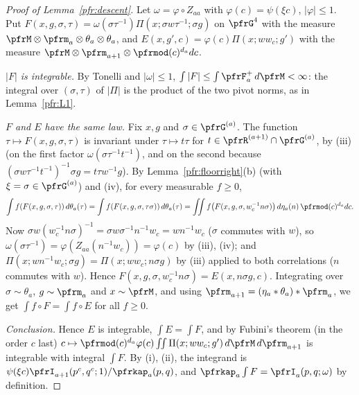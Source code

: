 \documentclass[10pt]{amsart}
\theoremstyle{definition}
\theoremstyle{remark}
\begin{document}
\begin{proof}[Proof of Lemma~\ref{pfr:descent}]
Let $\omega=\varphi\circ Z_{aa}$ with $\varphi(c)=\psi(\xi c)$, $|\varphi|\le1$. Put
$F(x,g,\sigma,\tau)=\omega(\sigma\tau^{-1})\Pi(x;\sigma w\tau^{-1};\sigma g)$ on $\pfrG^4$ with the measure
$\pfrM\otimes\pfrm_a\otimes\theta_a\otimes\theta_a$, and $E(x,g',c)=\varphi(c)\Pi(x;ww_c;g')$ with the measure
$\pfrM\otimes\pfrm_{a+1}\otimes\pfrmod(c)^{d_a}dc$.

\emph{$|F|$ is integrable.} By Tonelli and $|\omega|\le1$, $\int|F|\le\int\pfrF_a^+\,d\pfrM<\infty$: the integral over
$(\sigma,\tau)$ of $|\Pi|$ is the product of the two pivot norms, as in Lemma~\ref{pfr:L1}.

\emph{$F$ and $E$ have the same law.} Fix $x,g$ and $\sigma\in\pfrG^{(a)}$. The function $\tau\mapsto F(x,g,\sigma,\tau)$
is invariant under $\tau\mapsto t\tau$ for $t\in\pfrR^{(a+1)}\cap\pfrG^{(a)}$, by (iii) (on the first factor
$\omega(\sigma\tau^{-1}t^{-1})$, and on the second because $(\sigma w\tau^{-1}t^{-1})^{-1}\sigma g=t\tau w^{-1}g$). By
Lemma~\ref{pfr:floorright}(b) (with $\xi=\sigma\in\pfrG^{(a)}$) and (iv), for every measurable $f\ge0$,
\[
\int f(F(x,g,\sigma,\tau))\,d\theta_a(\tau)=\int f(F(x,g,\sigma,\tau\sigma))\,d\theta_a(\tau)=\iint
f\bigl(F(x,g,\sigma,w_c^{-1}n\sigma)\bigr)\,d\eta_a(n)\,\pfrmod(c)^{d_a}dc .
\]
Now $\sigma w(w_c^{-1}n\sigma)^{-1}=\sigma w\sigma^{-1}n^{-1}w_c=wn^{-1}w_c$ ($\sigma$ commutes with $w$), so
$\omega(\sigma\tau^{-1})=\varphi(Z_{aa}(n^{-1}w_c))=\varphi(c)$ by (iii), (iv); and
$\Pi(x;wn^{-1}w_c;\sigma g)=\Pi(x;ww_c;n\sigma g)$ by (iii) applied to both correlations ($n$ commutes with $w$).
Hence $F(x,g,\sigma,w_c^{-1}n\sigma)=E(x,n\sigma g,c)$. Integrating over $\sigma\sim\theta_a$, $g\sim\pfrm_a$ and $x\sim\pfrM$,
and using $\pfrm_{a+1}=(\eta_a*\theta_a)*\pfrm_a$, we get $\int f\circ F=\int f\circ E$ for all $f\ge0$.

\emph{Conclusion.} Hence $E$ is integrable, $\int E=\int F$, and by Fubini's theorem (in the order $c$ last)
$c\mapsto\pfrmod(c)^{d_a}\varphi(c)\iint\Pi(x;ww_c;g')\,d\pfrM\,d\pfrm_{a+1}$ is integrable with integral $\int F$. By
(i), (ii), the integrand is $\psi(\xi c)\pfrI_{a+1}(p^c,q^c;1)/\pfrkap_a(p,q)$, and $\pfrkap_a\int F=\pfrI_a(p,q;\omega)$ by
definition.
\end{proof}
\end{document}
